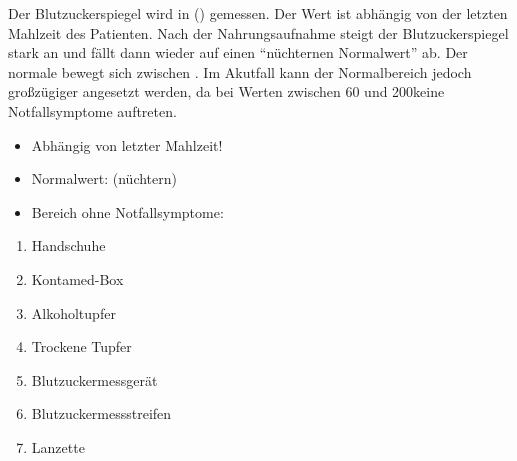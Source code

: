 {
Der Blutzuckerspiegel wird in 
(\MgDl{}) 
gemessen. Der
Wert ist abhängig von der letzten Mahlzeit des Patienten.
Nach der Nahrungsaufnahme steigt der Blutzuckerspiegel stark
an und fällt dann wieder auf einen \enquote{nüchternen
Normalwert} ab. Der normale 
bewegt sich zwischen  
. Im
Akutfall kann der Normalbereich jedoch großzügiger
angesetzt werden, da bei Werten zwischen 60 und 200\MgDl*
keine Notfallsymptome auftreten.
\cite{HeroldInnereMedizin2012}
}{
\begin{itemize}
    \item Abhängig von letzter Mahlzeit!
    \item Normalwert: \MgDl*
    (nüchtern)
    \item Bereich ohne Notfallsymptome:
    \MgDl*
\end{itemize}
}{}{}{}

{
\begin{enumerate}
  \item Handschuhe
  \item Kontamed-Box
  \item Alkoholtupfer
  \item Trockene Tupfer
  \item Blutzuckermessgerät
  \item Blutzuckermessstreifen
  \item Lanzette
\end{enumerate}
}
{}


